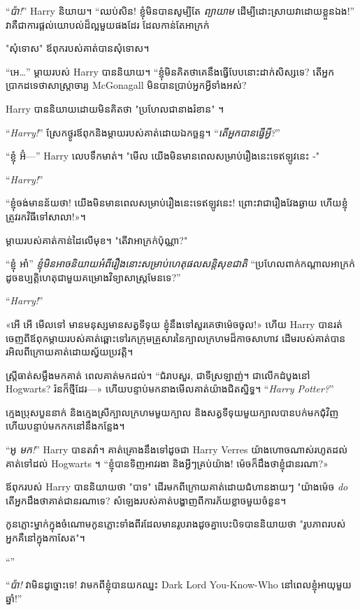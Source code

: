 “\emph{ប៉ា!}” Harry និយាយ។ “ឈប់សិន! ខ្ញុំ​មិន​បាន​សូម្បី​តែ \emph{ព្យាយាម} ដើម្បី​ដោះស្រាយ​វា​ដោយ​ខ្លួន​ឯង!” វាគឺជាការផ្តល់យោបល់ដ៏ល្អមួយផងដែរ ដែលកាន់តែអាក្រក់

"សុំទោស" ឪពុករបស់គាត់បានសុំទោស។

“អេ…” ម្តាយរបស់ Harry បាននិយាយ។ “ខ្ញុំ​មិន​គិត​ថា​គេ​នឹង​ធ្វើ​បែប​នោះ​ដាក់​សិស្ស​ទេ? តើអ្នកប្រាកដទេថាសាស្រ្តាចារ្យ McGonagall មិនបានប្រាប់អ្នកអ្វីទាំងអស់?

Harry បាននិយាយដោយមិនគិតថា "ប្រហែលជានាងរំខាន" ។

“\emph{Harry!}” ស្រែកថ្ងូរឪពុកនិងម្តាយរបស់គាត់ដោយឯកច្ឆន្ទ។ “\emph{តើអ្នកបានធ្វើអ្វី?}”

“ខ្ញុំ អ៊ំ—” Harry លេបទឹកមាត់។ "មើល យើងមិនមានពេលសម្រាប់រឿងនេះទេឥឡូវនេះ -"

“\emph{Harry!}”

“ខ្ញុំ​ចង់​មាន​ន័យ​ថា! យើងមិនមានពេលសម្រាប់រឿងនេះទេឥឡូវនេះ! ព្រោះ​វា​ជា​រឿង​វែង​ឆ្ងាយ ហើយ​ខ្ញុំ​ត្រូវ​រក​វិធី​ទៅ​សាលា!»។

ម្តាយ​របស់​គាត់​កាន់​ដៃ​លើ​មុខ។ "តើវាអាក្រក់ប៉ុណ្ណា?"

“ខ្ញុំ អា៎” \emph{ខ្ញុំមិនអាចនិយាយអំពីរឿងនោះសម្រាប់ហេតុផលសន្តិសុខជាតិ} “ប្រហែលពាក់កណ្តាលអាក្រក់ដូចឧប្បត្តិហេតុជាមួយគម្រោងវិទ្យាសាស្ត្រមែនទេ?”

“\emph{Harry!}”

«អើ អើ មើល​ទៅ មាន​មនុស្ស​មាន​សត្វ​ទីទុយ ខ្ញុំ​នឹង​ទៅ​សួរ​គេ​ថា​ម៉េច​ចូល!» ហើយ Harry បានរត់ចេញពីឪពុកម្តាយរបស់គាត់ឆ្ពោះទៅរកក្រុមគ្រួសារនៃក្បាលក្រហមដ៏កាចសាហាវ ដើមរបស់គាត់បានរអិលពីក្រោយគាត់ដោយស្វ័យប្រវត្តិ។

ស្ត្រី​ធាត់​សម្លឹង​មក​គាត់ ពេល​គាត់​មក​ដល់។ “ជំរាបសួរ, ជាទីស្រឡាញ់។ ជាលើកដំបូងនៅ Hogwarts? រ៉ន​ក៏​ថ្មី​ដែរ—» ហើយ​បន្ទាប់​មក​នាង​មើល​គាត់​យ៉ាង​ជិត​ស្និទ្ធ។ “\emph{Harry Potter?}”

ក្មេងប្រុសបួននាក់ និងក្មេងស្រីក្បាលក្រហមមួយក្បាល និងសត្វទីទុយមួយក្បាលបានបក់មកជុំវិញ ហើយបន្ទាប់មកកកនៅនឹងកន្លែង។

“អូ \emph{មក!}” Harry បានតវ៉ា។ គាត់គ្រោងនឹងទៅដូចជា Harry Verres យ៉ាងហោចណាស់រហូតដល់គាត់ទៅដល់ Hogwarts ។ “ខ្ញុំបានទិញអាវរងា និងអ្វីៗគ្រប់យ៉ាង! ម៉េច​ក៏​ដឹង​ថា​ខ្ញុំ​ជា​នរណា?»

ឪពុករបស់ Harry បាននិយាយថា "បាទ" ដើរមកពីក្រោយគាត់ដោយជំហានងាយៗ "យ៉ាងម៉េច \emph{do} តើអ្នកដឹងថាគាត់ជានរណាទេ? សំឡេង​របស់​គាត់​បង្ហាញ​ពី​ការ​ភ័យ​ខ្លាច​មួយ​ចំនួន។

កូនភ្លោះម្នាក់ក្នុងចំណោមកូនភ្លោះទាំងពីរដែលមានរូបរាងដូចគ្នាបេះបិទបាននិយាយថា "រូបភាពរបស់អ្នកគឺនៅក្នុងកាសែត"។

“”

“\emph{ប៉ា!} វាមិនដូច្នោះទេ! វាមកពីខ្ញុំបានយកឈ្នះ Dark Lord You-Know-Who នៅពេលខ្ញុំអាយុមួយឆ្នាំ!”

